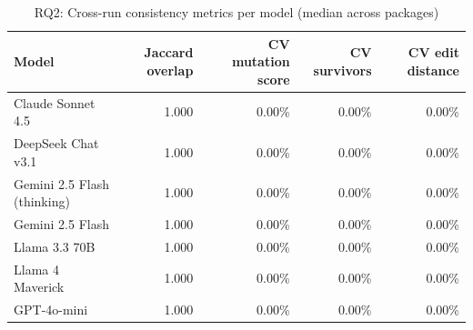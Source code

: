\begin{table}[htbp]
\centering
{\small
\begin{tabular}{l|rrrr}
\hline
\textbf{Model} & \textbf{Jaccard overlap} & \textbf{CV mutation score} & \textbf{CV survivors} & \textbf{CV edit distance} \\
\hline
Claude Sonnet 4.5 & 1.000 & 0.00\% & 0.00\% & 0.00\% \\
DeepSeek Chat v3.1 & 1.000 & 0.00\% & 0.00\% & 0.00\% \\
Gemini 2.5 Flash (thinking) & 1.000 & 0.00\% & 0.00\% & 0.00\% \\
Gemini 2.5 Flash & 1.000 & 0.00\% & 0.00\% & 0.00\% \\
Llama 3.3 70B & 1.000 & 0.00\% & 0.00\% & 0.00\% \\
Llama 4 Maverick & 1.000 & 0.00\% & 0.00\% & 0.00\% \\
GPT-4o-mini & 1.000 & 0.00\% & 0.00\% & 0.00\% \\
\hline
\end{tabular}
}
\caption{RQ2: Cross-run consistency metrics per model (median across packages)}
\label{tab:rq2-consistency}
\end{table}